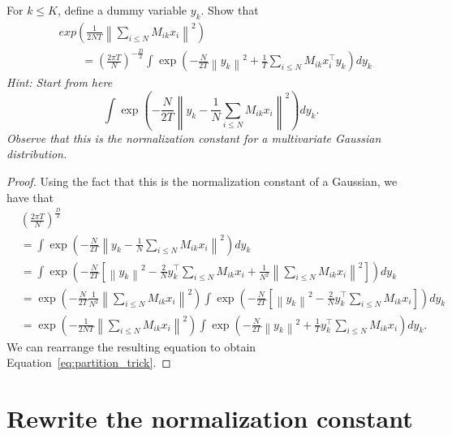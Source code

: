 \begin{exercise}
For $k \leq K$, define a dummy variable $y_k$. Show that
%
\begin{align}
&exp\left(\frac{1}{2NT}\left\|\sum_{i \leq N} M_{ik}x_i\right\|^2\right)\\
&\qquad = \left(\frac{2\pi T}{N}\right)^{-\frac{D}{2}} \int \exp\left(- \frac{N}{2T}\left\|y_k\right\|^2 + \frac{1}{T}\sum_{i \leq N}M_{ik}x_i^\top y_k\right)dy_k
\label{eq:partition_trick}
\end{align}
%
\textit{Hint: Start from here
%
$$\int \exp\left(-\frac{N}{2T} \left\|y_k - \frac{1}{N}\sum_{i \leq N}M_{ik}x_i\right\|^2\right)dy_k.$$
%
Observe that this is the normalization constant for a multivariate Gaussian distribution.}
\end{exercise}

\begin{proof}
Using the fact that this is the normalization constant of a Gaussian, we have that
%
\begin{align}
&\left(\frac{2\pi T}{N}\right)^{\frac{D}{2}}\\
 &= \int \exp\left(-\frac{N}{2T} \left\|y_k - \frac{1}{N}\sum_{i \leq N}M_{ik}x_i\right\|^2\right)dy_k\\
&= \int \exp\left(-\frac{N}{2T}\left[ \left\|y_k\right\|^2 - \frac{2}{N}y_k^\top\sum_{i \leq N}M_{ik}x_i + \frac{1}{N^2}\left\|\sum_{i \leq N}M_{ik}x_i\right\|^2\right]\right)dy_k\\
&= \exp\left(-\frac{N}{2T}\frac{1}{N^2}\left\|\sum_{i \leq N}M_{ik}x_i\right\|^2\right)\int \exp\left(-\frac{N}{2T}\left[ \left\|y_k\right\|^2 - \frac{2}{N}y_k^\top\sum_{i \leq N}M_{ik}x_i\right]\right)dy_k\\
&= \exp\left(-\frac{1}{2NT}\left\|\sum_{i \leq N}M_{ik}x_i\right\|^2\right)\int \exp\left(-\frac{N}{2T}\left\|y_k\right\|^2 +\frac{1}{T}y_k^\top\sum_{i \leq N}M_{ik}x_i\right)dy_k.
\end{align}
%
We can rearrange the resulting equation to obtain Equation~\ref{eq:partition_trick}.
\end{proof}

\section{Rewrite the normalization constant}
\label{sec:swap_sum_prod}

